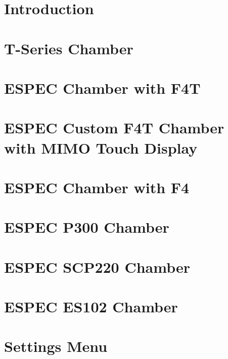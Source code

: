 \documentclass[11pt,twoside,openany]{book}
\begin{document}
%
%
\cleardoublepage 
\tableofcontents              %
\cleardoublepage              %
%
%
\part{Introduction}


\part{T-Series Chamber}


\part{ESPEC Chamber with F4T} 
 

\part{ESPEC Custom F4T Chamber with MIMO Touch Display } 
 


\part{ESPEC Chamber with F4}
 

\part{ESPEC P300 Chamber} 
 

\part{ESPEC SCP220 Chamber}
 

\part{ESPEC ES102 Chamber}
 

\part{Settings Menu} 


 

\end{document}
